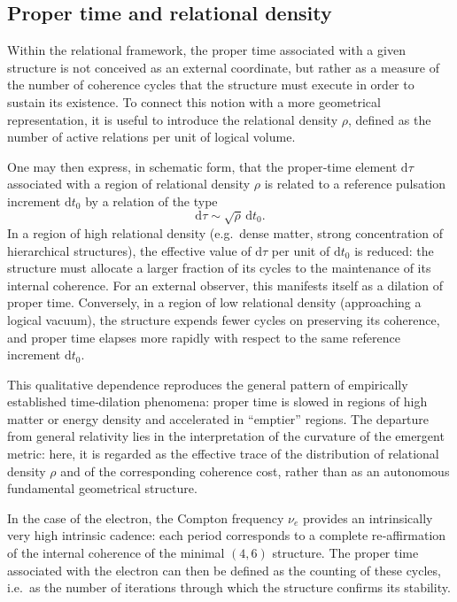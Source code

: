 \documentclass[11pt,a4paper]{article}
\begin{document}
\subsection*{Proper time and relational density}
Within the relational framework, the proper time associated with a given structure is not conceived as an external coordinate, but rather as a measure of the number of coherence cycles that the structure must execute in order to sustain its existence. To connect this notion with a more geometrical representation, it is useful to introduce the relational density \(\rho\), defined as the number of active relations per unit of logical volume.

One may then express, in schematic form, that the proper‑time element \(\mathrm{d}\tau\) associated with a region of relational density \(\rho\) is related to a reference pulsation increment \(\mathrm{d}t_{0}\) by a relation of the type
\[
\mathrm{d}\tau \sim \sqrt{\rho}\,\mathrm{d}t_{0}.
\]
In a region of high relational density (e.g.\ dense matter, strong concentration of hierarchical structures), the effective value of \(\mathrm{d}\tau\) per unit of \(\mathrm{d}t_{0}\) is reduced: the structure must allocate a larger fraction of its cycles to the maintenance of its internal coherence. For an external observer, this manifests itself as a dilation of proper time. Conversely, in a region of low relational density (approaching a logical vacuum), the structure expends fewer cycles on preserving its coherence, and proper time elapses more rapidly with respect to the same reference increment \(\mathrm{d}t_{0}\).

This qualitative dependence reproduces the general pattern of empirically established time‑dilation phenomena: proper time is slowed in regions of high matter or energy density and accelerated in “emptier” regions. The departure from general relativity lies in the interpretation of the curvature of the emergent metric: here, it is regarded as the effective trace of the distribution of relational density \(\rho\) and of the corresponding coherence cost, rather than as an autonomous fundamental geometrical structure.

In the case of the electron, the Compton frequency \(\nu_e\) provides an intrinsically very high intrinsic cadence: each period corresponds to a complete re‑affirmation of the internal coherence of the minimal \((4,6)\) structure. The proper time associated with the electron can then be defined as the counting of these cycles, i.e.\ as the number of iterations through which the structure confirms its stability.
\end{document}
